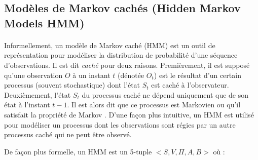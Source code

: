 \subsection{Modèles de Markov cachés (Hidden Markov Models HMM)}
\paragraph{}
Informellement, un modèle de Markov caché (HMM) est un outil de représentation pour modéliser la distribution de probabilité d'une séquence d'observations. Il est dit \textit{caché} pour deux raisons. Premièrement, il est supposé qu'une observation $O$ à un instant $t$ (dénotée $O_t$)  est le résultat d'un certain processus (souvent stochastique) dont l'état $S_t$ est caché à l'observateur. Deuxièmement, l'état $S_t$ du processus caché ne dépend uniquement que de son état à l'instant $t-1$. Il est alors dit que ce processus est Markovien ou qu'il satisfait la propriété de Markov \citep{hmm_intro,markov_process}. D'une façon plus intuitive, un HMM  est utilisé pour modéliser un processus dont les observations sont régies par un autre processus caché qui ne peut être observé.
\par De façon plus formelle, un HMM est un 5-tuple $<S,V,\Pi,A,B>$ \citep{hmm_formal} où :
